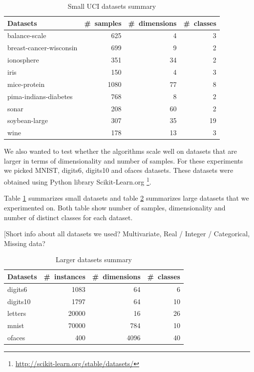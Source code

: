\documentclass[12pt,a4paper]{report}
\begin{document}
\begin{table}[ht] \centering
\begin{tabular}{lrrr}
\hline
Datasets & \#~samples & \#~dimensions & \#~classes \\
\hline
balance-scale           & 625   & 4    & 3  \\
breast-cancer-wisconsin & 699   & 9    & 2  \\
ionosphere              & 351   & 34   & 2  \\
iris                    & 150   & 4    & 3  \\
mice-protein            & 1080  & 77   & 8  \\
pima-indians-diabetes   & 768   & 8    & 2  \\
sonar                   & 208   & 60   & 2  \\
soybean-large           & 307   & 35   & 19 \\
wine                    & 178   & 13   & 3  \\
\hline
\end{tabular}
\caption{Small UCI datasets summary} \label{tab:datasets}
\end{table}

We also wanted to test whether the algorithms scale well on datasets that are larger  in terms of dimensionality and number of samples. For these experiments we picked MNIST, digits6, digits10 and ofaces datasets. These datasets were obtained using Python library Scikit-Learn.org \footnote{\url{http://scikit-learn.org/stable/datasets/}}.

Table \ref{tab:datasets} summarizes small datasets and table \ref{tab:datasets-big} summarizes large datasets that we experimented on. Both table show number of samples, dimensionality and number of distinct classes for each dataset.

[Short info about all datasets we used? Multivariate, Real / Integer / Categorical, Missing data? %

\begin{table}[ht] \centering
\begin{tabular}{lrrr}
\hline
Datasets & \#~instances & \#~dimensions & \#~classes \\
\hline
digits6                 & 1083  & 64   & 6  \\
digits10                & 1797  & 64   & 10 \\
letters                 & 20000 & 16   & 26 \\
mnist                   & 70000 & 784  & 10 \\
ofaces                  & 400   & 4096 & 40 \\
\hline
\end{tabular}
\caption{Larger datasets summary} \label{tab:datasets-big} 
\end{table}
\end{document}
